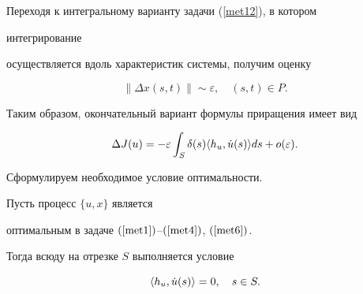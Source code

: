 Переходя к интегральному варианту задачи (\ref{met12}), в котором


интегрирование


осуществляется вдоль характеристик системы, получим оценку


\begin{equation}


\|\Delta x(s,t)\|\sim\varepsilon,\quad (s,t)\in P.


\label{met13}


\end{equation}





Таким образом, окончательный вариант формулы приращения имеет вид


$$


\Delta J(u)=-\varepsilon\int_S


\delta(s) \la h_u,\Dot{u}(s)\ra ds +o(\varepsilon).


$$





Сформулируем необходимое условие оптимальности.





\begin{thm}


Пусть процесс $\{u,x\}$ является 


оптимальным в задаче $(\ref{met1})$--$(\ref{met4})$, $(\ref{met6})$.


Тогда всюду на  отрезке $S$ выполняется условие


\begin{equation}


\la h_u, \Dot{u} (s)\ra=0,\quad s\in S.


\label{met14}


\end{equation} 


\end{thm}





